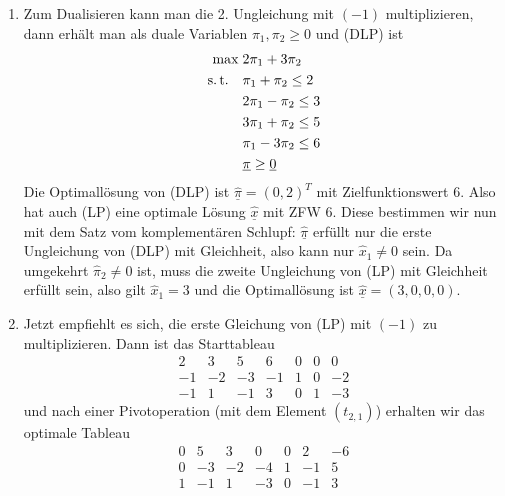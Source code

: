 \documentclass[11pt,german,a4paper,parskip=half-]{scrartcl}
\newcommand\st{\text{s.\,t.}\xspace}
\renewcommand{\u}[1]{\ensuremath{\underline{#1}}} %
\begin{document}
\begin{solution}[2+2 Punkte]
 \begin{enumerate}
  \item Zum Dualisieren kann man die 2. Ungleichung mit $(-1)$ multiplizieren, dann erhält man als duale Variablen $\pi_1, \pi_2 \geq 0$ und (DLP) ist
\begin{align*}
 \max\;&2\pi_1 + 3 \pi_2\\
\st\quad&\pi_1+\pi_2 \leq 2\\
&2\pi_1 -\pi_2 \leq 3\\
&3 \pi_1 + \pi_2 \leq 5\\
&\pi_1 - 3\pi_2 \leq 6\\
&\u \pi \geq \u 0
\end{align*}
Die Optimallösung von (DLP) ist $\hat{\u{\pi}} = (0,2)^T$ mit Zielfunktionswert $6$. Also hat auch (LP) eine optimale Lösung $\hat{\u x}$ mit ZFW $6$. Diese bestimmen wir nun mit dem Satz vom komplementären
Schlupf: $\hat{\u \pi}$ erfüllt nur die erste Ungleichung von (DLP) mit Gleichheit, also kann nur $\hat x_1 \neq 0$ sein. Da umgekehrt $\hat\pi_2 \neq 0$ ist, muss die zweite Ungleichung von (LP) mit Gleichheit
erfüllt sein, also gilt $\hat x_1 = 3$ und die Optimallösung ist $\u{\hat x} = (3,0,0,0)$.
\item Jetzt empfiehlt es sich, die erste Gleichung von (LP) mit $(-1)$ zu multiplizieren. Dann ist das Starttableau
\[\begin{array}{rrrrrr|r}
   2&3&5&6&0&0&0\\\hline
   -1&-2&-3&-1&1&0&-2\\
   -1&1&-1&3&0&1&-3
  \end{array}\]
und nach einer Pivotoperation (mit dem Element $(t_{2,1})$) erhalten wir das optimale Tableau
\[\begin{array}{rrrrrr|r}
   0&5&3&0&0&2&-6\\\hline
   0&-3&-2&-4&1&-1&5\\
   1&-1&1&-3&0&-1&3
  \end{array}\]
 \end{enumerate}
\end{solution}
\end{document}
